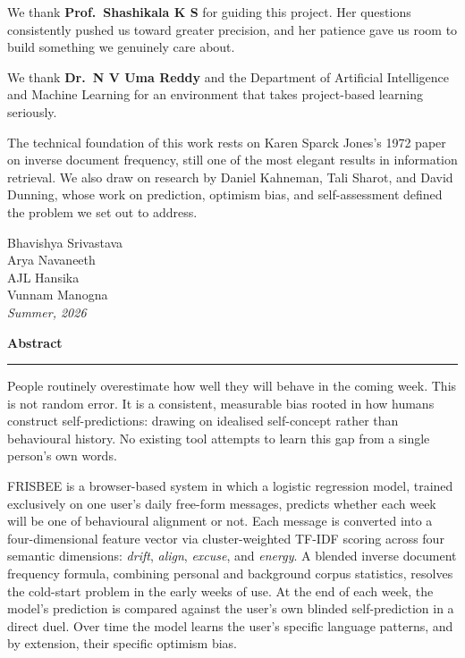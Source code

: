 \documentclass[11pt, a4paper]{report}
\begin{document}
We thank \textbf{Prof.\ Shashikala K S} for guiding this project. Her
questions consistently pushed us toward greater precision, and her
patience gave us room to build something we genuinely care about.

We thank \textbf{Dr.\ N V Uma Reddy} and the Department of Artificial
Intelligence and Machine Learning for an environment that takes
project-based learning seriously.

The technical foundation of this work rests on Karen Sparck Jones's 1972
paper on inverse document frequency, still one of the most elegant results
in information retrieval. We also draw on research by Daniel Kahneman,
Tali Sharot, and David Dunning, whose work on prediction, optimism bias,
and self-assessment defined the problem we set out to address.

\vspace{1.8cm}
\begin{flushright}
  Bhavishya Srivastava\\
  Arya Navaneeth\\
  AJL Hansika\\
  Vunnam Manogna\\[5pt]
  \textit{Summer, 2026}
\end{flushright}

\newpage\thispagestyle{plain}
\vspace*{1.4cm}
\begin{center}
  {\Large\bfseries Abstract}\\[7pt]
  {\color{accent}\rule{0.38\textwidth}{0.4pt}}
\end{center}
\vspace{0.9cm}

People routinely overestimate how well they will behave in the coming
week. This is not random error. It is a consistent, measurable bias
rooted in how humans construct self-predictions: drawing on idealised
self-concept rather than behavioural history. No existing tool attempts
to learn this gap from a single person's own words.

FRISBEE is a browser-based system in which a logistic regression model,
trained exclusively on one user's daily free-form messages, predicts
whether each week will be one of behavioural alignment or not. Each
message is converted into a four-dimensional feature vector via
cluster-weighted TF-IDF scoring across four semantic dimensions:
\textit{drift}, \textit{align}, \textit{excuse}, and \textit{energy}.
A blended inverse document frequency formula, combining personal and
background corpus statistics, resolves the cold-start problem in the
early weeks of use. At the end of each week, the model's prediction is
compared against the user's own blinded self-prediction in a direct
duel. Over time the model learns the user's specific language patterns,
and by extension, their specific optimism bias.
\end{document}
